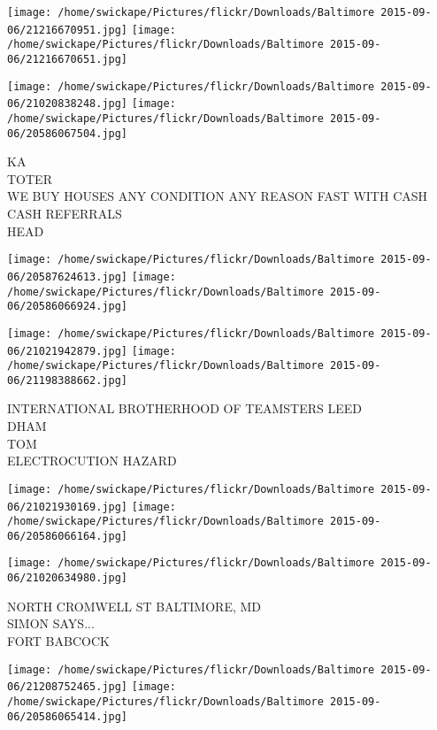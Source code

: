\documentclass[10pt,letterpaper]{article}
\begin{document}
\texttt{[image: /home/swickape/Pictures/flickr/Downloads/Baltimore 2015-09-06/21216670951.jpg]}
\texttt{[image: /home/swickape/Pictures/flickr/Downloads/Baltimore 2015-09-06/21216670651.jpg]}

\texttt{[image: /home/swickape/Pictures/flickr/Downloads/Baltimore 2015-09-06/21020838248.jpg]}
\texttt{[image: /home/swickape/Pictures/flickr/Downloads/Baltimore 2015-09-06/20586067504.jpg]}

KA\\
TOTER\\
WE BUY HOUSES ANY CONDITION ANY REASON FAST WITH CASH CASH REFERRALS\\
HEAD\\
\pagebreak

\texttt{[image: /home/swickape/Pictures/flickr/Downloads/Baltimore 2015-09-06/20587624613.jpg]}
\texttt{[image: /home/swickape/Pictures/flickr/Downloads/Baltimore 2015-09-06/20586066924.jpg]}

\texttt{[image: /home/swickape/Pictures/flickr/Downloads/Baltimore 2015-09-06/21021942879.jpg]}
\texttt{[image: /home/swickape/Pictures/flickr/Downloads/Baltimore 2015-09-06/21198388662.jpg]}

INTERNATIONAL BROTHERHOOD OF TEAMSTERS LEED\\
DHAM\\
TOM\\
ELECTROCUTION HAZARD\\
\pagebreak

\texttt{[image: /home/swickape/Pictures/flickr/Downloads/Baltimore 2015-09-06/21021930169.jpg]}
\texttt{[image: /home/swickape/Pictures/flickr/Downloads/Baltimore 2015-09-06/20586066164.jpg]}

\vspace{0.25in}
\texttt{[image: /home/swickape/Pictures/flickr/Downloads/Baltimore 2015-09-06/21020634980.jpg]}

NORTH CROMWELL ST BALTIMORE, MD\\
SIMON SAYS...\\
FORT BABCOCK\\
\pagebreak

\texttt{[image: /home/swickape/Pictures/flickr/Downloads/Baltimore 2015-09-06/21208752465.jpg]}
\texttt{[image: /home/swickape/Pictures/flickr/Downloads/Baltimore 2015-09-06/20586065414.jpg]}
\end{document}
